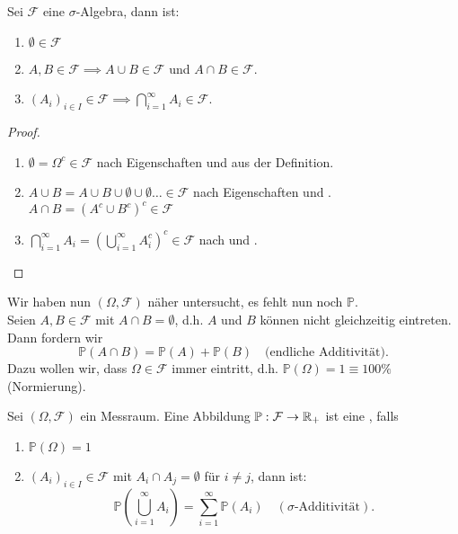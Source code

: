 \begin{lemma}
    Sei $\mathcal{F}$ eine $\sigma$-Algebra, dann ist:
    \begin{enumerate}[label=\protect\circled{\alph*}]
        \item $\emptyset\in \mathcal{F}$
        \item $A,B \in \mathcal{F} \implies A \cup B \in \mathcal{F}$ und $A\cap B \in \mathcal{F}$.
        \item $(A_i)_{i \in I}\in \mathcal{F} \implies \bigcap_{i=1}^{\infty}A_i \in \mathcal{F}$.
    \end{enumerate}
\end{lemma}
\begin{proof}
    \begin{enumerate}[label=\protect\circled{\alph*}]
        \item $\emptyset = \Omega^{c} \in \mathcal{F}$ nach Eigenschaften  und  aus der Definition.
        \item $A \cup B = A \cup B \cup \emptyset \cup \emptyset \ldots \in \mathcal{F}$ nach Eigenschaften   und . $A \cap B = (A^{c}\cup B ^{c})^{c} \in \mathcal{F}$
        \item $\bigcap_{i=1}^{\infty}A_i = \left( \bigcup_{i=1}^{\infty}A_i^{c} \right) ^{c}\in \mathcal{F}$ nach  und .
    \end{enumerate}
\end{proof}

Wir haben nun $(\Omega, \mathcal{F})$ näher untersucht, es fehlt nun noch $\mathbb{P}$. \\
Seien $A,B \in \mathcal{F}$ mit $A\cap B = \emptyset$, d.h. $A$ und $B$ können nicht gleichzeitig eintreten. Dann fordern wir
\[
    \mathbb{P}(A \cap B) = \mathbb{P}(A) + \mathbb{P}(B) \quad \text{(endliche Additivität)}
.\] 
Dazu wollen wir, dass $\Omega \in \mathcal{F}$ immer eintritt, d.h. $\mathbb{P}(\Omega) = 1 \equiv  100\%$ (Normierung).

\begin{definition}
    Sei $(\Omega, \mathcal{F})$ ein Messraum. Eine Abbildung $\mathbb{P} : \mathcal{F} \to  \mathbb{R}_+$ ist eine , falls
    \begin{enumerate}[(1)]
        \item $\mathbb{P}(\Omega) = 1$
        \item $(A_i)_{i \in I}\in \mathcal{F}$ mit $A_i \cap A_j = \emptyset$ für $i\neq j$, dann ist:
            \[
                \mathbb{P}\left( \bigcup_{i=1}^{\infty}A_i \right) = \sum_{i=1}^{\infty} \mathbb{P}(A_i) \quad (\sigma\text{-Additivität})
            .\] 
    \end{enumerate}
\end{definition}

